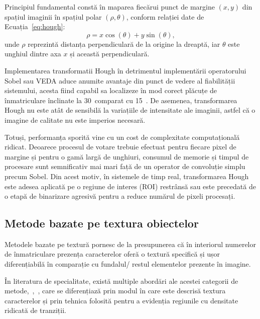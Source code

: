 Principiul fundamental constă în maparea fiecărui punct de margine $(x, y)$ din spațiul imaginii în spațiul polar $(\rho, \theta)$, conform relației date de Ecuația~\ref{eq:hough}:
\begin{equation}
  \rho = x \cos(\theta) + y \sin(\theta),
  \label{eq:hough}
\end{equation}
unde $\rho$ reprezintă distanța perpendiculară de la origine la dreaptă, iar $\theta$ este unghiul dintre axa $x$ și această perpendiculară.

Implementarea transformatii Hough în detrimentul implementării operatorului Sobel sau VEDA aduce anumite avantaje din punct de vedere al fiabilității sistemului, acesta fiind capabil sa localizeze în mod corect plăcuțe de înmatriculare înclinate la 30~\textdegree comparat cu 15~\textdegree. De asemenea, transformarea Hough nu este atât de sensibilă la variațiile de intensitate ale imaginii, astfel că o imagine de calitate nu este imperios necesară.

Totuși, performanța sporită vine cu un cost de complexitate computațională ridicat. Deoarece procesul de votare trebuie efectuat pentru fiecare pixel de margine și pentru o gamă largă de unghiuri, consumul de memorie și timpul de procesare sunt semnificativ mai mari față de un operator de convoluție simplu precum Sobel. Din acest motiv, în sistemele de timp real, transformarea Hough este adesea aplicată pe o regiune de interes (ROI) restrânsă sau este precedată de o etapă de binarizare agresivă pentru a reduce numărul de pixeli procesați.

\subsection{Metode bazate pe textura obiectelor}
\indent\par
Metodele bazate pe textură pornesc de la presupunerea că în interiorul numerelor de înmatriculare prezența caracterelor oferă o textură specifică și ușor diferențiabilă în comparație cu fundalul/ restul elementelor prezente în imagine.

În literatura de specialitate, există multiple abordări ale acestei categorii de metode,~\cite{bremananth2005robust},~\cite{anagnostopoulos2006license}, care se diferențiază prin modul în care este descrisă textura caracterelor și prin tehnica folosită pentru a evidenția regiunile cu densitate ridicată de tranziții.

